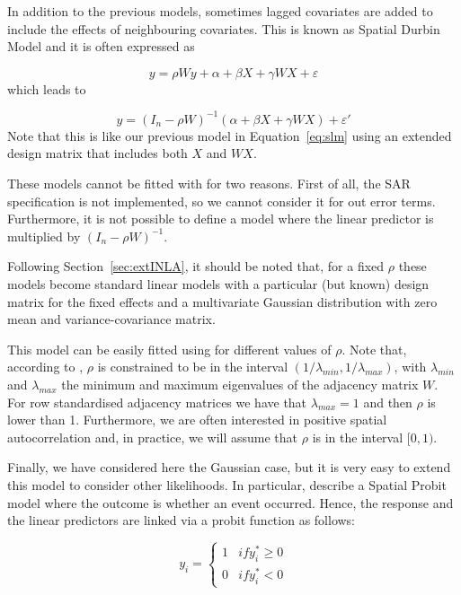 \documentclass[article]{jss}
\begin{document}
In addition to the previous models, sometimes lagged covariates are 
added to include the effects of neighbouring covariates. This is known
as Spatial Durbin Model  and it is often expressed as

\begin{equation}
y= \rho W y+ \alpha+\beta X+\gamma W X +\varepsilon 
\end{equation}
\noindent
which leads to

\begin{equation}
y= (I_n-\rho W)^{-1}(\alpha+\beta X+\gamma W X) +\varepsilon '
\end{equation}
\noindent
Note that this is like our previous model in Equation~\ref{eq:slm} using an extended
design matrix that includes both $X$ and $W X$.

These models cannot be fitted with  for two reasons. First of all, 
the SAR specification is not implemented, so we cannot consider it for out
error terms. Furthermore, it is not possible to define a model 
where the linear predictor is multiplied by $(I_n-\rho W)^{-1}$.

Following Section~\ref{sec:extINLA}, it should be noted that, for a fixed
$\rho$ these models become standard linear models with a particular 
(but known) design matrix for the fixed effects and a multivariate Gaussian
distribution with zero mean and variance-covariance matrix.

This model can be easily fitted using  for different values
of $\rho$. Note that, according to \citet{Haining:2003}, $\rho$ is constrained 
to be in the interval $(1/\lambda_{min}, 1/\lambda_{max})$, with
$\lambda_{min}$ and $\lambda_{max}$ the minimum and maximum eigenvalues of
the adjacency matrix $W$. For row standardised adjacency matrices we have that
$\lambda_{max}=1$ and then $\rho$ is lower than 1. Furthermore, we are often
interested in positive spatial autocorrelation and, in practice, we will
assume that $\rho$ is in the interval $[0,1)$.


Finally, we have considered here the Gaussian case, but it is very easy to
extend this model to consider other likelihoods. In particular,
\citet{LeSageetal:2011} describe a Spatial Probit model where the outcome is
whether an event occurred. Hence, the response and the linear predictors are
linked via a probit function as follows:

\begin{equation}
y_i=
\left\{
\begin{array}{cc}
1 & if y^*_i\geq 0\\
0 & if y^*_i < 0
\end{array}
\right.
\end{equation}
\end{document}
